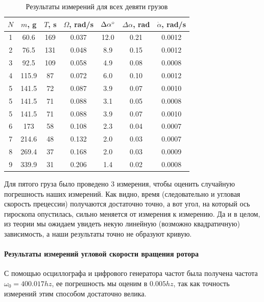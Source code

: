 \documentclass[a4paper,12pt]{article}
\begin{document}
	\begin{table}[H]
		\centering
		\begin{tabular}{|c|c|c|c|c|c|c|}
			\hline
			$N$ & $m$, g & $T$, s & $\Omega$, rad/s & $\Delta\alpha\degree$ & $\Delta\alpha$, rad & $\dot{\alpha}$, rad/s \\
			\hline
			1 & 60.6 & 169 & 0.037 & 12.0 & 0.21 & 0.0012 \\
			\hline
			2 & 76.5 & 131 & 0.048 & 8.9 & 0.15 & 0.0012 \\
			\hline
			3 & 92.5 & 109 & 0.058 & 4.9 & 0.08 & 0.0008 \\
			\hline
			4 & 115.9 & 87 & 0.072 & 6.0 & 0.10 & 0.0012 \\
			\hline
			5 & 141.5 & 72 & 0.087 & 3.9 & 0.07 & 0.0010 \\
			\hline
			5 & 141.5 & 71 & 0.088 & 3.1 & 0.05 & 0.0008 \\
			\hline
			5 & 141.5 & 71 & 0.088 & 3.9 & 0.07 & 0.0010 \\
			\hline
			6 & 173 & 58 & 0.108 & 2.3 & 0.04 & 0.0007 \\
			\hline
			7 & 214.6 & 48 & 0.132 & 2.0 & 0.03 & 0.0007 \\
			\hline
			8 & 269.4 & 37 & 0.168 & 2.0 & 0.03 & 0.0009 \\
			\hline
			9 & 339.9 & 31 & 0.206 & 1.4 & 0.02 & 0.0008 \\
			\hline
		\end{tabular}
		\caption{Результаты измерений для всех девяти грузов}
	\end{table}
	
	Для пятого груза было проведено 3 измерения, чтобы оценить случайную погрешность наших измерений. Как видно, время (следовательно и угловая скорость прецессии) получаются достаточно точно, а вот угол, на который ось гироскопа опустилась, сильно меняется от измерения к измерению. Да и в целом, из теории мы ожидаем увидеть некую линейную (возможно квадратичную) зависимость, а наши результаты точно не образуют кривую.\\
	
	\paragraph{Результаты измерений угловой скорости вращения ротора} С помощью осциллографа и цифрового генератора частот была получена частота $\omega_0=400.017 hz$, ее погрешность мы оценим в $0.005 hz$, так как точность измерений этим способом достаточно велика.\\
	
\end{document}
